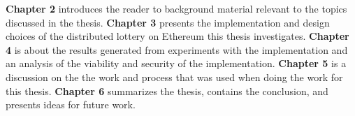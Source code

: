\textbf{Chapter 2} introduces the reader to background material relevant to the topics discussed in the thesis. \newline
\textbf{Chapter 3} presents the implementation and design choices of the distributed lottery on Ethereum this thesis investigates.
\newline
\textbf{Chapter 4} is about the results generated from experiments with the implementation and an analysis of the viability and security of the implementation.
\newline
\textbf{Chapter 5} is a discussion on the the work and process that was used when doing the work for this thesis.
\newline
\textbf{Chapter 6} summarizes the thesis, contains the conclusion, and presents ideas for future work. 
